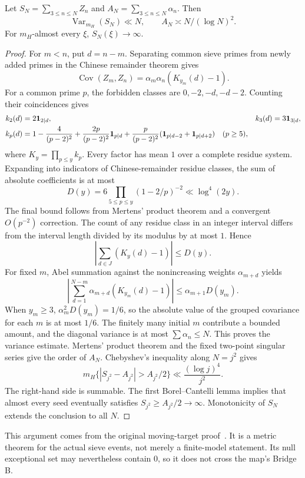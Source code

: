 \begin{theorem}\label{thm:haar}
Let $S_N=\sum_{3\le n\le N}Z_n$ and $A_N=\sum_{3\le n\le N}\alpha_n$. Then
\[
\operatorname{Var}_{m_H}(S_N)\ll N,\qquad A_N\asymp N/(\log N)^2.
\]
For $m_H$-almost every $\xi$, $S_N(\xi)\to\infty$.
\end{theorem}
\begin{proof}
For $m<n$, put $d=n-m$. Separating common sieve primes from newly added primes in the Chinese remainder theorem gives
\[
\operatorname{Cov}(Z_m,Z_n)=\alpha_m\alpha_n(K_{y_m}(d)-1).
\]
For a common prime $p$, the forbidden classes are $0,-2,-d,-d-2$. Counting their coincidences gives
\begin{align*}
k_2(d)&=2\mathbf 1_{2\mid d},&k_3(d)&=3\mathbf 1_{3\mid d},\\
k_p(d)&=1-\frac4{(p-2)^2}+\frac{2p}{(p-2)^2}\mathbf 1_{p\mid d}
+\frac p{(p-2)^2}(\mathbf 1_{p\mid d-2}+\mathbf 1_{p\mid d+2})\quad(p\ge5),
\end{align*}
where $K_y=\prod_{p\le y}k_p$. Every factor has mean $1$ over a complete residue system.
Expanding into indicators of Chinese-remainder residue classes, the sum of absolute coefficients is at most
\[
D(y)=6\prod_{5\le p\le y}(1-2/p)^{-2}\ll\log^4(2y).
\]
The final bound follows from Mertens' product theorem and a convergent $O(p^{-2})$ correction.
The count of any residue class in an integer interval differs from the interval length divided by its modulus by at most $1$. Hence
\[
\left|\sum_{d\in J}(K_y(d)-1)\right|\le D(y).
\]
For fixed $m$, Abel summation against the nonincreasing weights $\alpha_{m+d}$ yields
\[
\left|\sum_{d=1}^{N-m}\alpha_{m+d}(K_{y_m}(d)-1)\right|
\le\alpha_{m+1}D(y_m).
\]
When $y_m\ge3$, $\alpha_m^2D(y_m)=1/6$, so the absolute value of the grouped covariance for each $m$ is at most $1/6$.
The finitely many initial $m$ contribute a bounded amount, and the diagonal variance is at most $\sum\alpha_n\le N$. This proves the variance estimate.
Mertens' product theorem and the fixed two-point singular series give the order of $A_N$.
Chebyshev's inequality along $N=j^2$ gives
\[
m_H\{|S_{j^2}-A_{j^2}|>A_{j^2}/2\}\ll\frac{(\log j)^4}{j^2}.
\]
The right-hand side is summable. The first Borel--Cantelli lemma implies that almost every seed eventually satisfies $S_{j^2}\ge A_{j^2}/2\to\infty$. Monotonicity of $S_N$ extends the conclusion to all $N$.
\end{proof}
This argument comes from the original moving-target proof~\cite{archivedynamics}. It is a metric theorem for the actual sieve events, not merely a finite-model statement.
Its null exceptional set may nevertheless contain $0$, so it does not cross the map's Bridge B.


